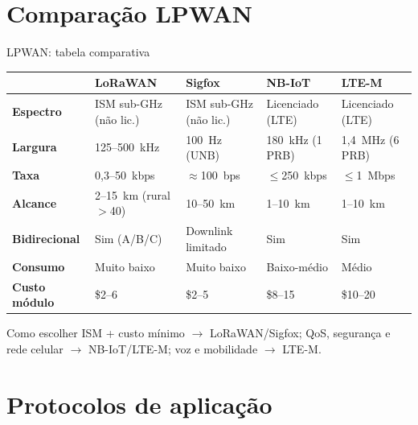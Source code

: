 \documentclass[aspectratio=169,11pt]{beamer}
\begin{document}
\section{Comparação LPWAN}

\begin{frame}{LPWAN: tabela comparativa}
  \begin{center}
    \scriptsize
    \setlength{\tabcolsep}{3pt}
    \renewcommand{\arraystretch}{1.25}
    \begin{tabular}{p{2.3cm}p{2.3cm}p{2.3cm}p{2.3cm}p{2.3cm}}
      \toprule
      & \textbf{LoRaWAN} & \textbf{Sigfox} & \textbf{NB-IoT} & \textbf{LTE-M}\\
      \midrule
      \textbf{Espectro} & ISM sub-GHz (não lic.) & ISM sub-GHz (não lic.) & Licenciado (LTE) & Licenciado (LTE)\\
      \textbf{Largura} & 125--500~kHz & 100~Hz (UNB) & 180~kHz (1 PRB) & 1,4~MHz (6 PRB)\\
      \textbf{Taxa} & 0,3--50~kbps & $\approx$100~bps & $\leq$250~kbps & $\leq$1~Mbps\\
      \textbf{Alcance} & 2--15~km (rural $>$40) & 10--50~km & 1--10~km & 1--10~km\\
      \textbf{Bidirecional} & Sim (A/B/C) & Downlink limitado & Sim & Sim\\
      \textbf{Consumo} & Muito baixo & Muito baixo & Baixo-médio & Médio\\
      \textbf{Custo módulo} & \$2--6 & \$2--5 & \$8--15 & \$10--20\\
      \bottomrule
    \end{tabular}
  \end{center}
  \pause
  \begin{exampleblock}{Como escolher}
    ISM + custo mínimo $\rightarrow$ LoRaWAN/Sigfox; QoS, segurança e rede celular $\rightarrow$ NB-IoT/LTE-M; voz e mobilidade $\rightarrow$ LTE-M.
  \end{exampleblock}
\end{frame}

\section{Protocolos de aplicação}
\end{document}
